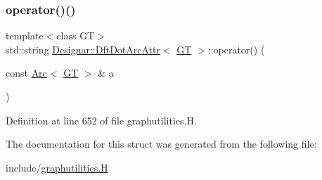 \subsubsection{\texorpdfstring{operator()()}{operator()()}}
{\footnotesize\ttfamily template$<$class GT$>$ \\
std\+::string \hyperlink{struct_designar_1_1_dft_dot_arc_attr}{Designar\+::\+Dft\+Dot\+Arc\+Attr}$<$ \hyperlink{demo-buildgraph_8_c_a3001c40d2c31ca87ed96cd7d1334a55e}{GT} $>$\+::operator() (\begin{DoxyParamCaption}\item[{const \hyperlink{namespace_designar_a3f55fb5513d62ff47cbc8f72b8e95d6f}{Arc}$<$ \hyperlink{demo-buildgraph_8_c_a3001c40d2c31ca87ed96cd7d1334a55e}{GT} $>$ \&}]{a }\end{DoxyParamCaption})\hspace{0.3cm}{\ttfamily [inline]}}



Definition at line 652 of file graphutilities.\+H.



The documentation for this struct was generated from the following file\+:\begin{DoxyCompactItemize}
\item 
include/\hyperlink{graphutilities_8_h}{graphutilities.\+H}\end{DoxyCompactItemize}
